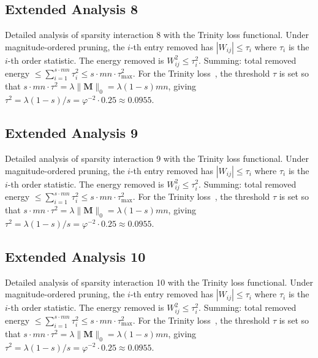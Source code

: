 \subsection{Extended Analysis 8}
\label{subsec:ext-8}

Detailed analysis of sparsity interaction 8 with the Trinity
loss functional.  Under magnitude-ordered pruning, the $i$-th entry removed has
$|W_{ij}| \leq \tau_i$ where $\tau_i$ is the $i$-th order statistic.  The
energy removed is $W_{ij}^2 \leq \tau_i^2$.  Summing: total removed energy
$\leq \sum_{i=1}^{s \cdot mn} \tau_i^2 \leq s \cdot mn \cdot \tau_{\max}^2$.
For the Trinity loss~\cite{hanetal2015deep}, the threshold $\tau$ is set so that
$s \cdot mn \cdot \tau^2 = \lambda \|\mathbf{M}\|_0 = \lambda (1-s) mn$, giving
$\tau^2 = \lambda(1-s)/s = \varphi^{-2} \cdot 0.25 \approx 0.0955$.


\subsection{Extended Analysis 9}
\label{subsec:ext-9}

Detailed analysis of sparsity interaction 9 with the Trinity
loss functional.  Under magnitude-ordered pruning, the $i$-th entry removed has
$|W_{ij}| \leq \tau_i$ where $\tau_i$ is the $i$-th order statistic.  The
energy removed is $W_{ij}^2 \leq \tau_i^2$.  Summing: total removed energy
$\leq \sum_{i=1}^{s \cdot mn} \tau_i^2 \leq s \cdot mn \cdot \tau_{\max}^2$.
For the Trinity loss~\cite{hanetal2015deep}, the threshold $\tau$ is set so that
$s \cdot mn \cdot \tau^2 = \lambda \|\mathbf{M}\|_0 = \lambda (1-s) mn$, giving
$\tau^2 = \lambda(1-s)/s = \varphi^{-2} \cdot 0.25 \approx 0.0955$.


\subsection{Extended Analysis 10}
\label{subsec:ext-10}

Detailed analysis of sparsity interaction 10 with the Trinity
loss functional.  Under magnitude-ordered pruning, the $i$-th entry removed has
$|W_{ij}| \leq \tau_i$ where $\tau_i$ is the $i$-th order statistic.  The
energy removed is $W_{ij}^2 \leq \tau_i^2$.  Summing: total removed energy
$\leq \sum_{i=1}^{s \cdot mn} \tau_i^2 \leq s \cdot mn \cdot \tau_{\max}^2$.
For the Trinity loss~\cite{hanetal2015deep}, the threshold $\tau$ is set so that
$s \cdot mn \cdot \tau^2 = \lambda \|\mathbf{M}\|_0 = \lambda (1-s) mn$, giving
$\tau^2 = \lambda(1-s)/s = \varphi^{-2} \cdot 0.25 \approx 0.0955$.


